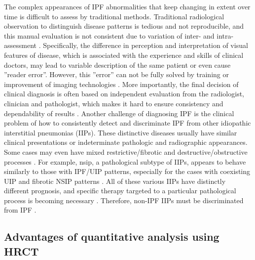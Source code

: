 The complex appearances of IPF abnormalities that keep changing in extent over time is difficult to assess by traditional methods. Traditional radiological observation to distinguish disease patterns is tedious and not reproducible, and this manual evaluation is not consistent due to variation of inter- and intra- assessment \citep{flaherty2007idiopathic, watadani2013interobserver}. Specifically, the difference in perception and interpretation of visual features of disease, which is associated with the experience and skills of clinical doctors, may lead to variable description of the same patient or even cause ''reader error''. However, this ''error'' can not be fully solved by training or improvement of imaging technologies \citep{kundel2006history,bartholmai2013quantitative}. More importantly, the final decision of clinical diagnosis is often based on independent evaluation from the radiologist, clinician and pathologist, which makes it hard to ensure consistency and dependability of results  \citep{flaherty2004idiopathic,sverzellati2011method}. Another challenge of diagnosing IPF is the clinical problem of how to consistently detect and discriminate IPF from other idiopathic interstitial pneumonias (IIPs). These distinctive diseases usually have similar clinical presentations or indeterminate pathologic and radiographic appearances. Some cases may even have mixed restrictive/fibrotic and destructive/obstructive processes \citep{bartholmai2013quantitative}. For example, \gls{nsip}, a pathological subtype of IIPs, appears to behave similarly to those with IPF/UIP patterns, especially for the cases with coexisting UIP and fibrotic NSIP patterns \citep{monaghan2004prognostic, flaherty2001histopathologic}. All of these various IIPs have distinctly different prognosis, and specific therapy targeted to a particular pathological process is becoming necessary \citep{lynch2005high}. Therefore, non-IPF IIPs must be discriminated from IPF \citep{bjoraker1998prognostic}. 

\subsection{Advantages of quantitative analysis using HRCT} \label{Advantages}

